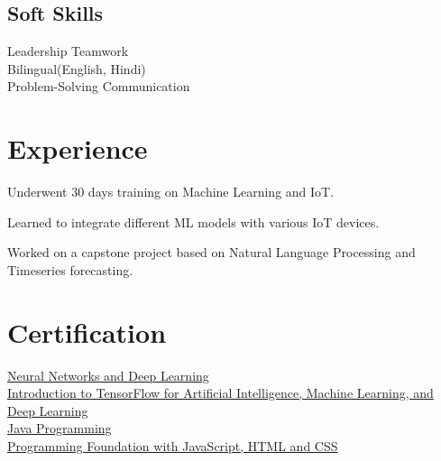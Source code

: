 \documentclass[]{deedy-resume-openfont}
\begin{document}
\begin{minipage}[t]{0.40\textwidth}
\subsection{Soft Skills}
Leadership \textbullet{} Teamwork\\ 
Bilingual(English, Hindi)\\
Problem-Solving \textbullet{} Communication
\sectionsep
\sectionsep

\section{Experience}
\vspace{\topsep} %
\begin{tightemize}
\item Underwent 30 days training on Machine Learning and IoT.
\item Learned to integrate different ML models with various IoT devices.
\item Worked on a capstone project based on Natural Language Processing and Timeseries forecasting.
\end{tightemize}
\sectionsep

\section{Certification} 

\textbullet{}  \href{https://www.coursera.org/verify/E97BDRL3T2L8}{Neural Networks and Deep Learning}\\
\sectionsep
\textbullet{}  \href{https://www.coursera.org/verify/DZ632TAD79WH}{Introduction to TensorFlow for Artificial Intelligence, Machine Learning, and Deep Learning}\\
\sectionsep
\textbullet{}  \href{https://www.coursera.org/verify/TJE3ZUZPNU4K}{Java Programming}\\
\sectionsep
\textbullet{}  \href{https://www.coursera.org/verify/4BECE8N7EVTT}{Programming Foundation with JavaScript, HTML and CSS}\\
\sectionsep

%
%

\end{minipage} 
\end{document}
